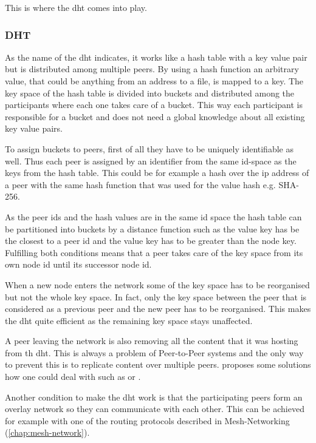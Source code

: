 This is where the \gls{dht} comes into play.

\subsubsection{DHT}
As the name of the \gls{dht} indicates, it works like a hash table with a key value pair but is distributed among multiple peers. By using a hash function an arbitrary value, that could be anything from an address to a file, is mapped to a key. The key space of the hash table is divided into buckets and distributed among the participants where each one takes care of a bucket. This way each participant is responsible for a bucket and does not need a global knowledge about all existing key value pairs. 

To assign buckets to peers, first of all they have to be uniquely identifiable as well. Thus each peer is assigned by an identifier from the same id-space as the keys from the hash table. This could be for example a hash over the \gls{ip} address of a peer with the same hash function that was used for the value hash e.g. SHA-256.

As the peer ids and the hash values are in the same id space the hash table can be partitioned into buckets by a distance function such as the value key has be the closest to a peer id and the value key has to be greater than the node key. Fulfilling both conditions means that a peer takes care of the key space from its own node id until its successor node id.

When a new node enters the network some of the key space has to be reorganised but not the whole key space. In fact, only the key space between the peer that is considered as a previous peer and the new peer has to be reorganised. This makes the \gls{dht} quite efficient as the remaining key space stays unaffected. 

A peer leaving the network is also removing all the content that it was hosting from th \gls{dht}. This is always a problem of Peer-to-Peer systems and the only way to prevent this is to replicate content over multiple peers. \citet[\S3]{chord} proposes some solutions how one could deal with such as  or .

Another condition to make the \gls{dht} work is that the participating peers form an overlay network so they can communicate with each other. This can be achieved for example with one of the routing protocols described in Mesh-Networking (\vref{chap:mesh-network}).

